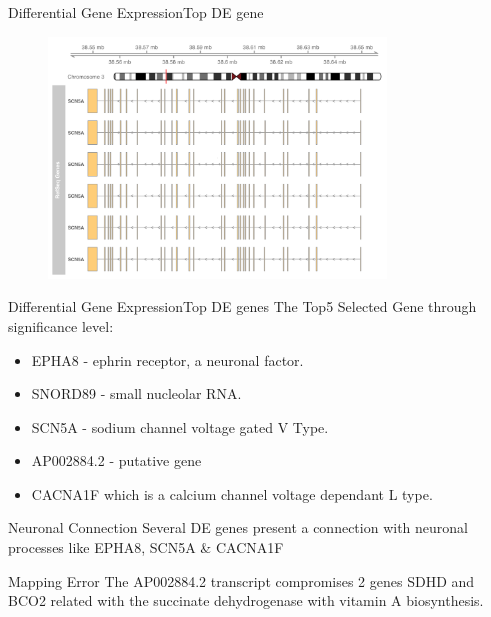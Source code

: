 \documentclass{beamer}
\begin{document}
\begin{frame}{Differential Gene Expression}{Top DE gene}

   \begin{figure}
        \includegraphics[width=0.8\textwidth,height=0.8\textheight,keepaspectratio]{SCN5A}
    \end{figure}

\end{frame}

\begin{frame}{Differential Gene Expression}{Top DE genes}
The Top5 Selected Gene through significance level: \cite{proteinatlas,uhlen2015tissue}
\begin{itemize}
	\item  EPHA8 - ephrin receptor, a neuronal factor.
    \item SNORD89 - small nucleolar RNA.
    \item SCN5A - sodium channel voltage gated V Type.
    \item AP002884.2  - putative gene 
    \item CACNA1F which is a calcium channel voltage dependant L type.
\end{itemize}
\pause
\begin{block}{Neuronal Connection}
Several DE genes present a connection with neuronal processes like EPHA8, SCN5A \& CACNA1F
\end{block}
\pause
\begin{block}{Mapping Error}
The AP002884.2 transcript compromises 2 genes SDHD and BCO2 related with the succinate dehydrogenase with vitamin A biosynthesis.\cite{kent2002human}
\end{block}
\end{frame}
\end{document}
